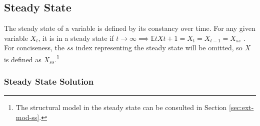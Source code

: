 \documentclass[../thesis.tex]{subfiles}
\begin{document}
 

\begin{comment}

\begin{align}
	& \text{where:} \quad Y_{\eta t} = C_{\eta 1 t} + C_{\eta 2 t} + I_{\eta t} %
	L_{\eta t} &= \int_{0}^{1} L_{\eta jt} \dif j %
\end{align}

\end{comment}



\subsection{Steady State}


The steady state of a variable is defined by its constancy over time. For any given variable $X_t$, it is in a steady state if $t \to \infty \implies \mathbb{E}t X{t+1} = X_t = X_{t-1} = X_{ss}$ \cite[p. 41]{costa_junior_understanding_2016}. For conciseness, the $ss$ index representing the steady state will be omitted, so $X$ is defined as $X_{ss}$.\footnote{The structural model in the steady state can be consulted in Section \eqref{sec:ext-mod-ss}.}



\subsubsection{Steady State Solution}
\end{document}
